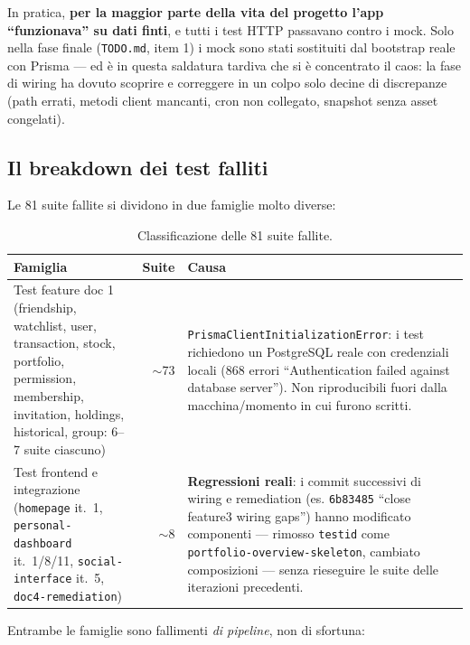 \documentclass[11pt,a4paper]{article}
\newcommand{\fail}[1]{\textcolor{failred}{\textbf{#1}}}
\newcommand{\file}[1]{\texttt{\small #1}}
\begin{document}
In pratica, \textbf{per la maggior parte della vita del progetto l'app ``funzionava'' su dati finti}, e tutti i test HTTP passavano contro i mock. Solo nella fase finale (\file{TODO.md}, item 1) i mock sono stati sostituiti dal bootstrap reale con Prisma --- ed \`e in questa saldatura tardiva che si \`e concentrato il caos: la fase di wiring ha dovuto scoprire e correggere in un colpo solo decine di discrepanze (path errati, metodi client mancanti, cron non collegato, snapshot senza asset congelati).

\subsection{Il breakdown dei test falliti}
\label{sec:test-breakdown}

Le 81 suite fallite si dividono in due famiglie molto diverse:

\begin{table}[h!]
\centering
\small
\begin{tabular}{p{6.2cm}rp{6.2cm}}
\toprule
\textbf{Famiglia} & \textbf{Suite} & \textbf{Causa} \\
\midrule
Test feature doc 1 (friendship, watchlist, user, transaction, stock, portfolio, permission, membership, invitation, holdings, historical, group: 6--7 suite ciascuno) & $\sim$73 & \file{PrismaClientInitializationError}: i test richiedono un PostgreSQL reale con credenziali locali (868 errori ``Authentication failed against database server''). Non riproducibili fuori dalla macchina/momento in cui furono scritti. \\
\addlinespace
Test frontend e integrazione (\file{homepage} it.~1, \file{personal-dashboard} it.~1/8/11, \file{social-interface} it.~5, \file{doc4-remediation}) & $\sim$8 & \fail{Regressioni reali}: i commit successivi di wiring e remediation (es. \file{6b83485} ``close feature3 wiring gaps'') hanno modificato componenti --- rimosso \file{testid} come \file{portfolio-overview-skeleton}, cambiato composizioni --- senza rieseguire le suite delle iterazioni precedenti. \\
\bottomrule
\end{tabular}
\caption{Classificazione delle 81 suite fallite.}
\end{table}

Entrambe le famiglie sono fallimenti \emph{di pipeline}, non di sfortuna:
\end{document}
